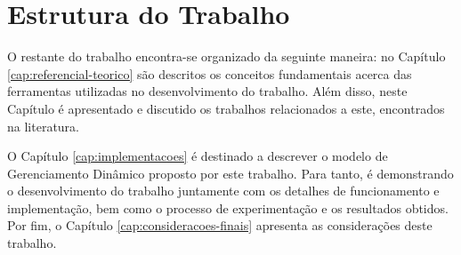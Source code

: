 \section{Estrutura do Trabalho}
O restante do trabalho encontra-se organizado da seguinte maneira: no Capítulo \ref{cap:referencial-teorico} são descritos os conceitos fundamentais acerca das ferramentas utilizadas no desenvolvimento do trabalho. Além disso, neste Capítulo é apresentado e discutido os trabalhos relacionados a este, encontrados na literatura. 

O Capítulo \ref{cap:implementacoes} é destinado a descrever o modelo de Gerenciamento Dinâmico proposto por este trabalho. Para tanto, é demonstrando o desenvolvimento do trabalho juntamente com os detalhes de funcionamento e implementação, bem como o processo de experimentação e os resultados obtidos. Por fim, o Capítulo \ref{cap:consideracoes-finais} apresenta as considerações deste trabalho.

